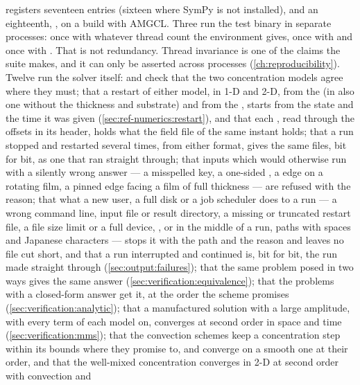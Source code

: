  registers seventeen entries (sixteen where SymPy is not
installed), and an eighteenth, , on a build with
AMGCL. Three run the test binary in separate
processes: once with whatever thread count the environment gives, once with
 and once with . That is not
redundancy. Thread invariance is one of the claims the suite makes, and it can
only be asserted across processes (\cref{ch:reproducibility}). Twelve run the
solver itself:  and  check
that the two concentration models agree where they must;
 that a restart of either model, in 1-D and 2-D, from
the  (in  also one without the thickness and substrate) and from the , starts from the state and the
time it was given (\cref{sec:ref-numerics:restart}), and that each , read through the offsets in its header, holds what the field file of the same instant holds; 
that a run stopped and restarted several times, from either format, gives the
same files, bit for bit, as one that ran straight through; 
that inputs which would otherwise run with a silently wrong answer --- a misspelled key, a
one-sided , a  edge on a rotating film, a
pinned edge facing a film of full thickness ---
are refused with the reason;  that what a new user, a full
disk or a job scheduler does to a run --- a wrong command line, input file or
result directory, a missing or truncated restart file, a file size limit or a
full device, ,  or  in the middle
of a run, paths with spaces and Japanese characters --- stops it with the path
and the reason and leaves no file cut short, and that a run interrupted and
continued is, bit for bit, the run made straight through
(\cref{sec:output:failures});  that the same problem
posed in two ways gives the same answer (\cref{sec:verification:equivalence});
 that the problems with a closed-form answer get it, at
the order the scheme promises (\cref{sec:verification:analytic}); 
that a manufactured solution with a large amplitude, with every term of each
model on, converges at second order in space and time
(\cref{sec:verification:mms});  that the convection schemes
keep a concentration step within its bounds where they promise to, and
converge on a smooth one at their order, and that the well-mixed
concentration converges in 2-D at second order with convection and
